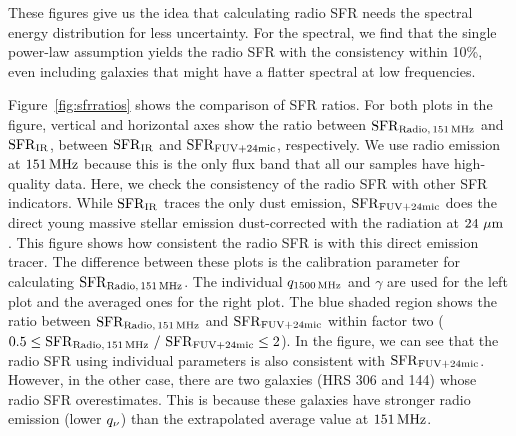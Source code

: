 These figures give us the idea that calculating radio SFR needs the spectral energy distribution for less uncertainty.
For the spectral, we find that the single power-law assumption yields the radio SFR with the consistency within 10\%, even including galaxies that might have a flatter spectral at low frequencies.

Figure~\ref{fig:sfrratios} shows the comparison of SFR ratios.
For both plots in the figure, vertical and horizontal axes show the ratio between $\mathrm{SFR}_{\mathrm{Radio},\,151\,\mathrm{MHz}}$ and $\mathrm{SFR}_{\mathrm{IR}}$, between $\mathrm{SFR}_{\mathrm{IR}}$ and $\mathrm{SFR}_{\mathrm{FUV+24mic}}$, respectively.
We use radio emission at $151\,\mathrm{MHz}$ because this is the only flux band that all our samples have high-quality data.
Here, we check the consistency of the radio SFR with other SFR indicators.
While $\mathrm{SFR}_{\mathrm{IR}}$ traces the only dust emission, $\mathrm{SFR}_{\mathrm{FUV+24mic}}$ does the direct young massive stellar emission dust-corrected with the radiation at $24\,\,\mathrm{\mu m}$ \citep{Murphy2011, Kennicutt2012}.
This figure shows how consistent the radio SFR is with this direct emission tracer.
The difference between these plots is the calibration parameter for calculating $\mathrm{SFR}_{\mathrm{Radio},\,151\,\mathrm{MHz}}$.
The individual $q_{1500\,\mathrm{MHz}}$ and $\gamma$ are used for the left plot and the averaged ones for the right plot.
The blue shaded region shows the ratio between $\mathrm{SFR}_{\mathrm{Radio},\,151\,\mathrm{MHz}}$ and $\mathrm{SFR}_{\mathrm{FUV+24mic}}$ within factor two ($0.5 \leq \mr{SFR}_{\mr{Radio},\,151\MHz}\ /\ \mr{SFR}\msb{FUV+24mic} \leq 2$).
In the figure, we can see that the radio SFR using individual parameters is also consistent with $\mathrm{SFR}_{\mathrm{FUV+24mic}}$.
However, in the other case, there are two galaxies (HRS 306 and 144) whose radio SFR overestimates.
This is because these galaxies have stronger radio emission (lower $q_{\nu}$) than the extrapolated average value at $151\,\mathrm{MHz}$.



%
%

